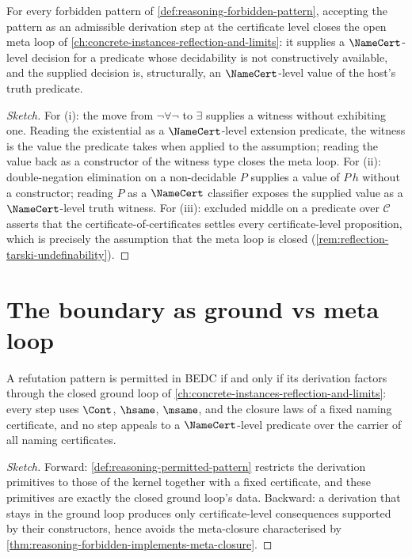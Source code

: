 \begin{theorem}
\label{thm:reasoning-forbidden-implements-meta-closure}
For every forbidden pattern of \autoref{def:reasoning-forbidden-pattern}, accepting the pattern as an admissible derivation step at the certificate level closes the open meta loop of \autoref{ch:concrete-instances-reflection-and-limits}: it supplies a $\NameCert$-level decision for a predicate whose decidability is not constructively available, and the supplied decision is, structurally, an $\NameCert$-level value of the host's truth predicate.
\end{theorem}

\begin{proof}[Sketch]
For (i): the move from $\neg \forall \neg$ to $\exists$ supplies a witness without exhibiting one. Reading the existential as a $\NameCert$-level extension predicate, the witness is the value the predicate takes when applied to the assumption; reading the value back as a constructor of the witness type closes the meta loop. For (ii): double-negation elimination on a non-decidable $P$ supplies a value of $P\,h$ without a constructor; reading $P$ as a $\NameCert$ classifier exposes the supplied value as a $\NameCert$-level truth witness. For (iii): excluded middle on a predicate over $\mathcal{C}$ asserts that the certificate-of-certificates settles every certificate-level proposition, which is precisely the assumption that the meta loop is closed (\autoref{rem:reflection-tarski-undefinability}).
\end{proof}

\section{The boundary as ground vs meta loop}
\label{sec:reasoning-boundary}

\begin{theorem}
\label{thm:reasoning-permitted-iff-ground}
A refutation pattern is permitted in BEDC if and only if its derivation factors through the closed ground loop of \autoref{ch:concrete-instances-reflection-and-limits}: every step uses $\Cont$, $\hsame$, $\msame$, and the closure laws of a fixed naming certificate, and no step appeals to a $\NameCert$-level predicate over the carrier of all naming certificates.
\end{theorem}

\begin{proof}[Sketch]
Forward: \autoref{def:reasoning-permitted-pattern} restricts the derivation primitives to those of the kernel together with a fixed certificate, and these primitives are exactly the closed ground loop's data. Backward: a derivation that stays in the ground loop produces only certificate-level consequences supported by their constructors, hence avoids the meta-closure characterised by \autoref{thm:reasoning-forbidden-implements-meta-closure}.
\end{proof}

